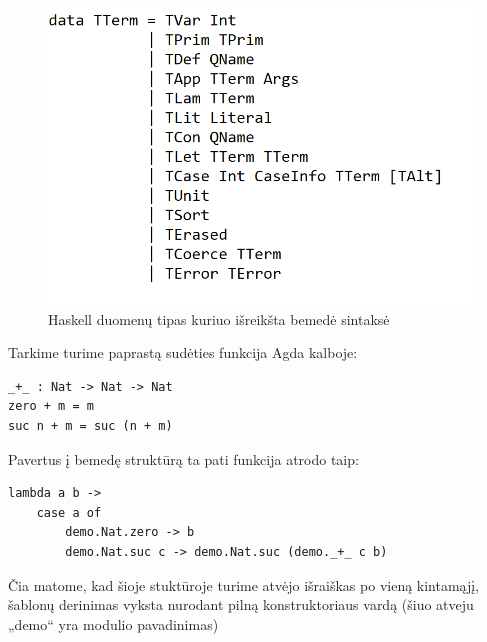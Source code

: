 \documentclass{VUMIFPSkursinis}
\begin{document}
\begin{itemize}
		\begin{figure}[H]
			\centering
			\includegraphics[scale=0.75]{TreelessTerm.png}
			\caption{Haskell duomenų tipas kuriuo išreikšta bemedė sintaksė}
			\label{img:tterm}
			\centering
			\end{figure}
\end{itemize}
Tarkime turime paprastą sudėties funkcija Agda kalboje:
\begin{lstlisting}
_+_ : Nat -> Nat -> Nat
zero + m = m
suc n + m = suc (n + m)
\end{lstlisting}
Pavertus į bemedę struktūrą ta pati funkcija atrodo taip:
\begin{lstlisting}
lambda a b ->
	case a of
		demo.Nat.zero -> b
		demo.Nat.suc c -> demo.Nat.suc (demo._+_ c b)
\end{lstlisting}
Čia matome, kad šioje stuktūroje turime atvėjo išraiškas po vieną kintamąjį, šablonų derinimas vyksta nurodant pilną konstruktoriaus vardą (šiuo atveju „demo“ yra modulio pavadinimas)
\end{document}
